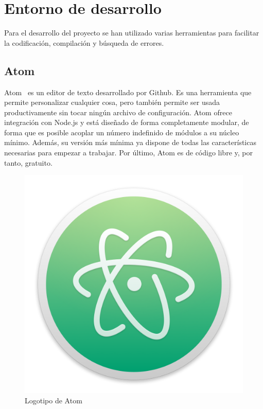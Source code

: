 \section{Entorno de desarrollo}

	Para el desarrollo del proyecto se han utilizado varias herramientas para facilitar la codificación, compilación y búsqueda de errores.

	\subsection{Atom}

		Atom~\cite{atom} es un editor de texto desarrollado por Github. Es una herramienta que permite personalizar cualquier cosa, pero también permite ser usada productivamente sin tocar ningún archivo de configuración. Atom ofrece integración con Node.js y está diseñado de forma completamente modular, de forma que es posible acoplar un número indefinido de módulos a su núcleo mínimo. Además, su versión más mínima ya dispone de todas las características necesarias para empezar a trabajar. Por último, Atom es de código libre y, por tanto, gratuito.

		\begin{figure}[!htp]
			 \centering
			 \includegraphics[scale=.15]{fig/atom}
			 \caption{Logotipo de Atom}
			 \label{fig:atom}
		\end{figure}

